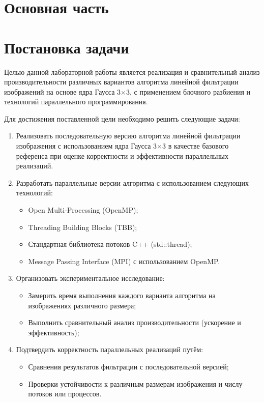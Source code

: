 \documentclass[14pt, a4paper]{extarticle}
\begin{document}
\section*{Основная часть}

\section{Постановка задачи}

Целью данной лабораторной работы является реализация и сравнительный анализ производительности различных вариантов алгоритма линейной фильтрации изображений на основе ядра Гаусса 3×3, с применением блочного разбиения и технологий параллельного программирования. 

Для достижения поставленной цели необходимо решить следующие задачи:

\begin{enumerate}
  \item Реализовать последовательную версию алгоритма линейной фильтрации изображения с использованием ядра Гаусса 3×3 в качестве базового референса при оценке корректности и эффективности параллельных реализаций.
  
  \item Разработать параллельные версии алгоритма с использованием следующих технологий:
  \begin{itemize}
    \item Open Multi-Processing (OpenMP);
    \item Threading Building Blocks (TBB);
    \item Стандартная библиотека потоков C++ (std::thread);
    \item Message Passing Interface (MPI) с использованием OpenMP.
  \end{itemize}
  
  \item Организовать экспериментальное исследование:
  \begin{itemize}
    \item Замерить время выполнения каждого варианта алгоритма на изображениях различного размера;
    \item Выполнить сравнительный анализ производительности (ускорение и эффективность);
  \end{itemize}
  
  \item Подтвердить корректность параллельных реализаций путём:
  \begin{itemize}
    \item Сравнения результатов фильтрации с последовательной версией;
    \item Проверки устойчивости к различным размерам изображения и числу потоков или процессов.
  \end{itemize}
\end{enumerate}
\end{document}

